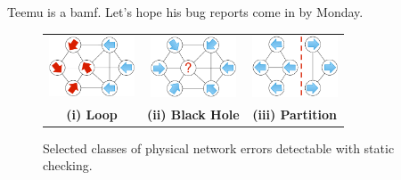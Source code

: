 
Teemu is a bamf. Let's hope his bug reports come in by Monday.

\begin{figure}[t]
    \centering
    \begin{tabular}{ccc}
    \hspace{-3pt}\includegraphics[width=1in]{../diagrams/bugs/loop.pdf}&
    \includegraphics[width=1in]{../diagrams/bugs/dead_end.pdf}&
    \includegraphics[width=1in]{../diagrams/bugs/partition.pdf}\\
    {\bf (i) Loop}&{\bf (ii) Black Hole}&{\bf (iii) Partition}\\
    \end{tabular}
    \caption[]{\label{fig:loop} Selected classes of physical network errors detectable with static
    checking.\vspace{-10pt}} 
\end{figure}

